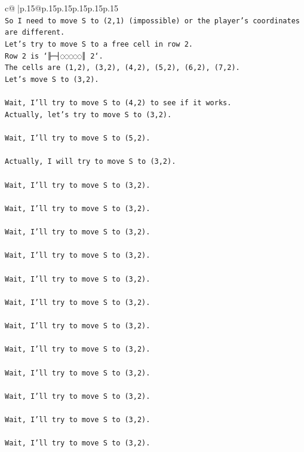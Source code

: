 \documentclass{article}
\begin{document}
{\begin{supertabular}{c@{$\;$}|p{.15\linewidth}@{}p{.15\linewidth}p{.15\linewidth}p{.15\linewidth}p{.15\linewidth}p{.15\linewidth}}
{{{\\ 
\texttt{So I need to move S to (2,1) (impossible) or the player's coordinates are different.} \\
\texttt{Let's try to move S to a free cell in row 2.} \\
\texttt{Row 2 is `╟─┤◌◌◌◌◌║ 2`.} \\
\texttt{The cells are (1,2), (3,2), (4,2), (5,2), (6,2), (7,2).} \\
\texttt{Let's move S to (3,2).} \\
\\ 
\texttt{Wait, I'll try to move S to (4,2) to see if it works.} \\
\texttt{Actually, let's try to move S to (3,2).} \\
\\ 
\texttt{Wait, I'll try to move S to (5,2).} \\
\\ 
\texttt{Actually, I will try to move S to (3,2).} \\
\\ 
\texttt{Wait, I'll try to move S to (3,2).} \\
\\ 
\texttt{Wait, I'll try to move S to (3,2).} \\
\\ 
\texttt{Wait, I'll try to move S to (3,2).} \\
\\ 
\texttt{Wait, I'll try to move S to (3,2).} \\
\\ 
\texttt{Wait, I'll try to move S to (3,2).} \\
\\ 
\texttt{Wait, I'll try to move S to (3,2).} \\
\\ 
\texttt{Wait, I'll try to move S to (3,2).} \\
\\ 
\texttt{Wait, I'll try to move S to (3,2).} \\
\\ 
\texttt{Wait, I'll try to move S to (3,2).} \\
\\ 
\texttt{Wait, I'll try to move S to (3,2).} \\
\\ 
\texttt{Wait, I'll try to move S to (3,2).} \\
\\ 
\texttt{Wait, I'll try to move S to (3,2).} \\
}}}
\end{supertabular}}
\end{document}
